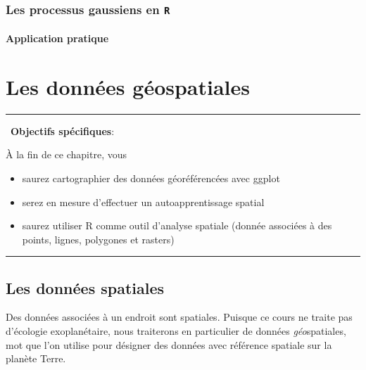 \documentclass[]{book}
\providecommand{\tightlist}{%
  \setlength{\itemsep}{0pt}\setlength{\parskip}{0pt}}
\begin{document}
\hypertarget{les-processus-gaussiens-en-r}{%
\subsection{\texorpdfstring{Les processus gaussiens en
\texttt{R}}{Les processus gaussiens en R}}\label{les-processus-gaussiens-en-r}}

\hypertarget{application-pratique}{%
\subsubsection{Application pratique}\label{application-pratique}}

\hypertarget{chapitre-geo}{%
\chapter{Les données géospatiales}\label{chapitre-geo}}

\begin{center}\rule{0.5\linewidth}{\linethickness}\end{center}

️~\textbf{Objectifs spécifiques}:

À la fin de ce chapitre, vous

\begin{itemize}
\tightlist
\item
  saurez cartographier des données géoréférencées avec ggplot
\item
  serez en mesure d'effectuer un autoapprentissage spatial
\item
  saurez utiliser R comme outil d'analyse spatiale (donnée associées à
  des points, lignes, polygones et rasters)
\end{itemize}

\begin{center}\rule{0.5\linewidth}{\linethickness}\end{center}

\hypertarget{les-donnuxe9es-spatiales}{%
\section{Les données spatiales}\label{les-donnuxe9es-spatiales}}

Des données associées à un endroit sont spatiales. Puisque ce cours ne
traite pas d'écologie exoplanétaire, nous traiterons en particulier de
données \emph{géo}spatiales, mot que l'on utilise pour désigner des
données avec référence spatiale sur la planète Terre.
\end{document}
